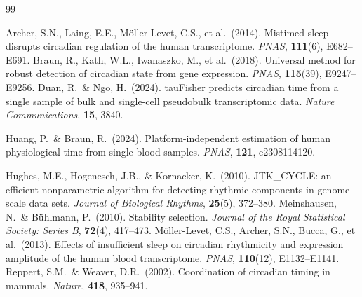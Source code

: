 \documentclass[10pt,a4paper]{article}
\begin{document}

\begin{thebibliography}{99}
\small
\setlength{\itemsep}{0pt}
\setlength{\parskip}{4pt}

Archer, S.N., Laing, E.E., Möller-Levet, C.S., et al.\ (2014).
Mistimed sleep disrupts circadian regulation of the human
transcriptome.
\emph{PNAS}, \textbf{111}(6), E682--E691.
Braun, R., Kath, W.L., Iwanaszko, M., et al.\ (2018).
Universal method for robust detection of circadian state from gene
expression.
\emph{PNAS}, \textbf{115}(39), E9247--E9256.
Duan, R.\ \& Ngo, H.\ (2024).
tauFisher predicts circadian time from a single sample of bulk and
single-cell pseudobulk transcriptomic data.
\emph{Nature Communications}, \textbf{15}, 3840.

Huang, P.\ \& Braun, R.\ (2024).
Platform-independent estimation of human physiological time from
single blood samples.
\emph{PNAS}, \textbf{121}, e2308114120.

Hughes, M.E., Hogenesch, J.B., \& Kornacker, K.\ (2010).
JTK\_CYCLE: an efficient nonparametric algorithm for detecting
rhythmic components in genome-scale data sets.
\emph{Journal of Biological Rhythms}, \textbf{25}(5), 372--380.
Meinshausen, N.\ \& B\"uhlmann, P.\ (2010).
Stability selection.
\emph{Journal of the Royal Statistical Society: Series B},
\textbf{72}(4), 417--473.
Möller-Levet, C.S., Archer, S.N., Bucca, G., et al.\ (2013).
Effects of insufficient sleep on circadian rhythmicity and
expression amplitude of the human blood transcriptome.
\emph{PNAS}, \textbf{110}(12), E1132--E1141.
Reppert, S.M.\ \& Weaver, D.R.\ (2002).
Coordination of circadian timing in mammals.
\emph{Nature}, \textbf{418}, 935--941.

\end{thebibliography}
\end{document}
